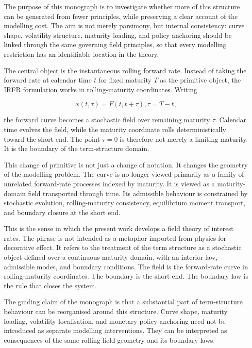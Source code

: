 \documentclass[11pt,oneside]{book}
\begin{document}
The purpose of this monograph is to investigate whether more of this
structure can be generated from fewer principles, while preserving a
clear account of the modelling cost. The aim is not merely parsimony,
but internal consistency: curve shape, volatility structure, maturity
loading, and policy anchoring should be linked through the same
governing field principles, so that every modelling restriction has an
identifiable location in the theory.

The central object is the instantaneous rolling forward rate. Instead of
taking the forward rate at calendar time \(t\) for fixed maturity \(T\) as the
primitive object, the IRFR formulation works in rolling-maturity
coordinates. Writing

\[
x(t,\tau) = F(t,t+\tau), \tau = T - t,
\]

the forward curve becomes a stochastic field over remaining maturity $\tau$.
Calendar time evolves the field, while the maturity coordinate rolls
deterministically toward the short end. The point $\tau=0$ is therefore not
merely a limiting maturity. It is the boundary of the term-structure
domain.

This change of primitive is not just a change of notation. It changes
the geometry of the modelling problem. The curve is no longer viewed
primarily as a family of unrelated forward-rate processes indexed by
maturity. It is viewed as a maturity-domain field transported through
time. Its admissible behaviour is constrained by stochastic evolution,
rolling-maturity consistency, equilibrium moment transport, and boundary
closure at the short end.

This is the sense in which the present work develops a field theory of
interest rates. The phrase is not intended as a metaphor imported from
physics for decorative effect. It refers to the treatment of the term
structure as a stochastic object defined over a continuous maturity
domain, with an interior law, admissible modes, and boundary conditions.
The field is the forward-rate curve in rolling-maturity coordinates. The
boundary is the short end. The boundary law is the rule that closes the
system.

The guiding claim of the monograph is that a substantial part of
term-structure behaviour can be reorganised around this structure. Curve
shape, maturity loading, volatility localisation, and monetary-policy
anchoring need not be introduced as separate modelling interventions.
They can be interpreted as consequences of the same rolling-field
geometry and its boundary laws.
\end{document}
